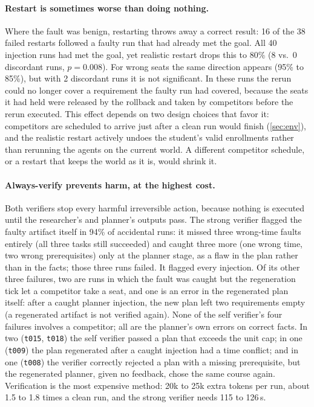 \documentclass[11pt]{article}
\newcommand{\code}[1]{\texttt{\small #1}}
\begin{document}
\paragraph{Restart is sometimes worse than doing nothing.} Where the fault was
benign, restarting throws away a correct result: 16 of the 38 failed restarts
followed a faulty run that had already met the goal. All 40 injection runs had
met the goal, yet realistic restart drops this to 80\% (8 vs.\ 0 discordant
runs, $p=0.008$). For wrong seats the same direction appears (95\% to 85\%),
but with 2 discordant runs it is not significant. In these runs the rerun
could no longer cover a requirement the faulty run had covered, because the
seats it had held were released by the rollback and taken by competitors
before the rerun executed. This effect depends on two design choices that
favor it: competitors are scheduled to arrive just after a clean run would
finish (\cref{sec:env}), and the realistic restart actively undoes the
student's valid enrollments rather than rerunning the agents on the current
world. A different competitor schedule, or a restart that keeps the world as
it is, would shrink it.

\paragraph{Always-verify prevents harm, at the highest cost.} Both verifiers
stop every harmful irreversible action, because nothing is executed until the
researcher's and planner's outputs pass. The strong verifier flagged the
faulty artifact itself in 94\% of accidental runs: it missed three wrong-time
faults entirely (all three tasks still succeeded) and caught three more (one
wrong time, two wrong prerequisites) only at the planner stage, as a flaw in
the plan rather than in the facts; those three runs failed. It flagged every
injection. Of its other three failures, two are runs in which the fault was
caught but the regeneration tick let a competitor take a seat, and one is an
error in the regenerated plan itself: after a caught planner injection, the
new plan left two requirements empty (a regenerated artifact is not verified
again). None of the self verifier's four failures involves a competitor; all
are the planner's own errors on correct facts. In two (\code{t015},
\code{t018}) the self verifier passed a plan that exceeds the unit cap; in one
(\code{t009}) the plan regenerated after a caught injection had a time
conflict; and in one (\code{t008}) the verifier correctly rejected a plan with
a missing prerequisite, but the regenerated planner, given no feedback, chose
the same course again. Verification is the most expensive method: 20k to 25k
extra tokens per run, about 1.5 to 1.8 times a clean run, and the strong
verifier needs 115 to 126\,s.
\end{document}
